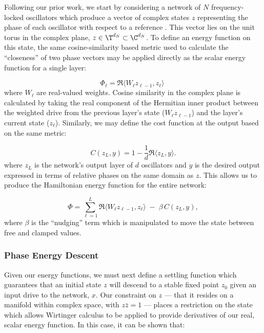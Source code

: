 Following our prior work, we start by considering a network of $N$ frequency-locked oscillators which produce a vector of complex states $z$ representing the phase of each oscillator with respect to a reference \cite{olin-ammentorpHyperdimensionalComputingProvides2023}. This vector lies on the unit torus in the complex plane, $z \in \T^{d_N} \subset \C^{d_N}$. To define an energy function on this state, the same cosine-similarity based metric used to calculate the ``closeness'' of two phase vectors may be applied directly as the scalar energy function for a single layer:

\begin{equation}\label{eq:phasor_layer_energy}
    \Phi_\ell =  \Re \langle W_\ell z_{\ell-1}, z_\ell \rangle \;
\end{equation}
where $W_\ell$ are real-valued weights. Cosine similarity in the complex plane is calculated by taking the real component of the Hermitian inner product between the weighted drive from the previous layer's state ($W_\ell z_{\ell-1}$) and the layer's current state ($z_\ell$). Similarly, we may define the cost function at the output based on the same metric:

\begin{equation}\label{eq:phasor-cost}
C(z_L, y) = 1 - \frac{1}{d}\Re\langle z_L, y \rangle.
\end{equation}
where $z_L$ is the network's output layer of $d$ oscillators and $y$ is the desired output expressed in terms of relative phases on the same domain as $z$. This allows us to produce the Hamiltonian energy function for the entire network:

\begin{equation}\label{eq:phasor-energy}
\Phi = \sum_{\ell=1}^L \Re\langle W_\ell z_{\ell-1}, z_\ell \rangle \;-\; \beta\, C(z_L, y),
\end{equation}
where $\beta$ is the ``nudging'' term which is manipulated to move the state between free and clamped values.

\subsubsection{Phase Energy Descent}

Given our energy functions, we must next define a settling function which guarantees that an initial state $z$ will descend to a stable fixed point $z_0$ given an input drive to the network, $x$. Our constraint on $z$ --- that it resides on a manifold within complex space, with $z \bar{z} =1$ --- places a restriction on the state which allows Wirtinger calculus to be applied to provide derivatives of our real, scalar energy function. In this case, it can be shown that:


